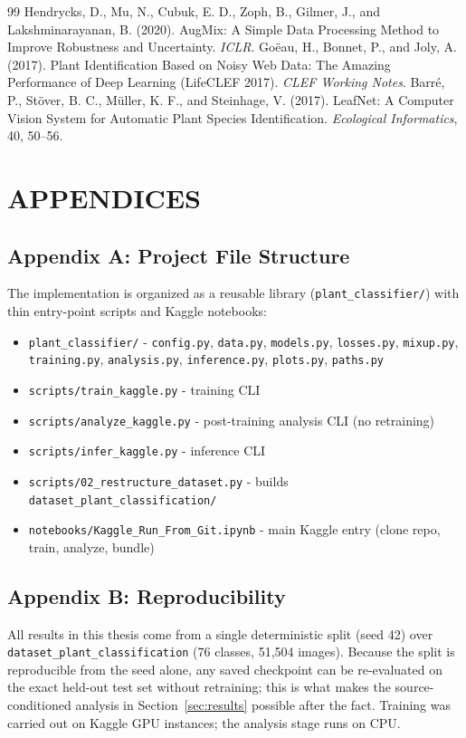 \documentclass[12pt,a4paper]{article}
\begin{document}
\begin{thebibliography}{99}
 Hendrycks, D., Mu, N., Cubuk, E. D., Zoph, B., Gilmer, J., and Lakshminarayanan, B. (2020). AugMix: A Simple Data Processing Method to Improve Robustness and Uncertainty. \emph{ICLR}.
 Go\"eau, H., Bonnet, P., and Joly, A. (2017). Plant Identification Based on Noisy Web Data: The Amazing Performance of Deep Learning (LifeCLEF 2017). \emph{CLEF Working Notes}.
 Barr\'e, P., St\"over, B. C., M\"uller, K. F., and Steinhage, V. (2017). LeafNet: A Computer Vision System for Automatic Plant Species Identification. \emph{Ecological Informatics}, 40, 50--56.
\end{thebibliography}

\clearpage
\section*{APPENDICES}

\subsection*{Appendix A: Project File Structure}
The implementation is organized as a reusable library (\texttt{plant\_classifier/}) with thin
entry-point scripts and Kaggle notebooks:
\begin{itemize}
    \item \texttt{plant\_classifier/} - \texttt{config.py}, \texttt{data.py}, \texttt{models.py}, \texttt{losses.py}, \texttt{mixup.py}, \texttt{training.py}, \texttt{analysis.py}, \texttt{inference.py}, \texttt{plots.py}, \texttt{paths.py}
    \item \texttt{scripts/train\_kaggle.py} - training CLI
    \item \texttt{scripts/analyze\_kaggle.py} - post-training analysis CLI (no retraining)
    \item \texttt{scripts/infer\_kaggle.py} - inference CLI
    \item \texttt{scripts/02\_restructure\_dataset.py} - builds \texttt{dataset\_plant\_classification/}
    \item \texttt{notebooks/Kaggle\_Run\_From\_Git.ipynb} - main Kaggle entry (clone repo, train, analyze, bundle)
\end{itemize}

\subsection*{Appendix B: Reproducibility}
All results in this thesis come from a single deterministic split (seed 42) over
\texttt{dataset\_\allowbreak plant\_\allowbreak classification} (76 classes, 51{,}504 images). Because the split is
reproducible from the seed alone, any saved checkpoint can be re-evaluated on the exact
held-out test set without retraining; this is what makes the source-conditioned analysis in
Section~\ref{sec:results} possible after the fact. Training was carried out on Kaggle GPU
instances; the analysis stage runs on CPU.
\end{document}
